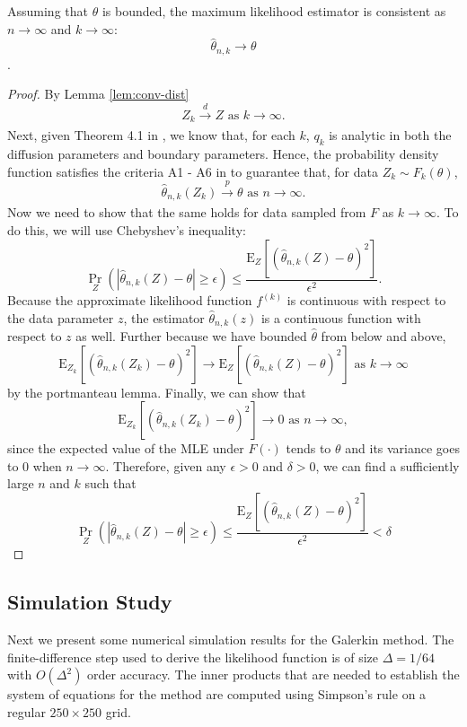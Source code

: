 \begin{lemma}
  Assuming that $\theta$ is bounded, the maximum likelihood estimator
  is consistent as $n \to \infty$ and
  $k \to \infty$: \[ \hat{\theta}_{n,k} \to \theta \].
\end{lemma}
\begin{proof}
  By Lemma \ref{lem:conv-dist}
    \[ Z_k \xrightarrow[]{d} Z \mbox { as } k \to \infty. \] Next,
    given Theorem 4.1 in \cite{singler2008differentiability}, we know
    that, for each $k$, $q_k$ is analytic in both the diffusion
    parameters and boundary parameters. Hence, the probability density
    function satisfies the criteria A1 - A6 in
    \cite{casella2002statistical} to guarantee that, for data
    $Z_{k} \sim F_k(\theta)$,
    \[ \hat{\theta}_{n,k}(Z_k) \xrightarrow[]{p} \theta \mbox{ as } n
      \to \infty. \]
    Now we need to show that the same holds for data sampled from $F$
    as $k \to \infty$. To do this, we will use Chebyshev's inequality:
      \[
    \Pr_{Z}\left( \left| \hat{\theta}_{n,k}(Z) - \theta \right| \geq
      \epsilon \right) \leq \frac{ \mbox{E}_{Z}\left[
        (\hat{\theta}_{n,k}(Z) - \theta)^2 \right] }{ \epsilon^2 }.
  \]
  Because the approximate likelihood function $f^{(k)}$ is continuous
  with respect to the data parameter $z$, the estimator
  $\hat{\theta}_{n,k}(z)$ is a continuous function with respect to $z$
  as well. Further because we have bounded $\hat{\theta}$ from below
  and above,
  \[
    \mbox{E}_{Z_k}\left[ (\hat{\theta}_{n,k}(Z_k) - \theta)^2 \right]
    \to \mbox{E}_{Z}\left[ (\hat{\theta}_{n,k}(Z) - \theta)^2 \right]
    \mbox{ as } k \to \infty
  \]
  by the portmanteau lemma. Finally, we can show that
  \begin{equation}
    \mbox{E}_{Z_k}\left[ (\hat{\theta}_{n,k}(Z_k) - \theta)^2 \right]
    \to 0 \mbox{ as } n \to \infty, \label{eq:var-lim}
  \end{equation}
  since the expected value of the MLE under $F(\cdot)$ tends to
  $\theta$ and its variance goes to 0 when $n \to \infty$. Therefore,
  given any $\epsilon > 0$ and $\delta > 0$, we can find a
  sufficiently large $n$ and $k$ such that
  \[
    \Pr_{Z}\left( \left| \hat{\theta}_{n,k}(Z) - \theta \right| \geq
      \epsilon \right) \leq \frac{ \mbox{E}_{Z}\left[
        (\hat{\theta}_{n,k}(Z) - \theta)^2 \right] }{ \epsilon^2 } < \delta    
  \]
\end{proof}

\subsection{Simulation Study}
Next we present some numerical simulation results for the Galerkin
method. The finite-difference step used to derive the likelihood
function is of size $\Delta = 1/64$ with $O(\Delta^2)$ order
accuracy. The inner products that are needed to establish the system
of equations for the method are computed using Simpson's rule on a
regular $250 \times 250$ grid.

